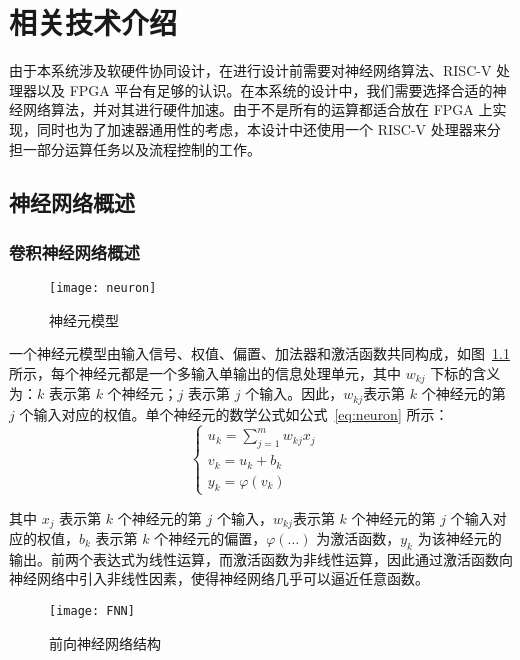 \chapter{相关技术介绍}\label{chap:relate}

由于本系统涉及软硬件协同设计，在进行设计前需要对神经网络算法、RISC-V 处理器以及 FPGA 平台有足够的认识。在本系统的设计中，我们需要选择合适的神经网络算法，并对其进行硬件加速。由于不是所有的运算都适合放在 FPGA 上实现，同时也为了加速器通用性的考虑，本设计中还使用一个 RISC-V 处理器来分担一部分运算任务以及流程控制的工作。

\section{神经网络概述}

\subsection{卷积神经网络概述}

\begin{figure}[!htbp]
    \centering
    \texttt{[image: neuron]}
    \caption{神经元模型}
    \label{fig:neuron}
\end{figure}

一个神经元模型由输入信号、权值、偏置、加法器和激活函数共同构成，如图~\ref{fig:neuron}所示，每个神经元都是一个多输入单输出的信息处理单元，其中 $w_{kj}$ 下标的含义为：$k$ 表示第 $k$ 个神经元；$j$ 表示第 $j$ 个输入。因此，$w_{kj}$表示第 $k$ 个神经元的第 $j$ 个输入对应的权值。单个神经元的数学公式如公式~\eqref{eq:neuron} 所示：
\begin{equation} \label{eq:neuron}
\begin{cases}
u_k = \sum_{j=1}^{m} w_{kj}x_j & \\
v_k = u_k + b_k & \\
y_k = \varphi(v_k) &
\end{cases}
\end{equation}

其中 $x_j$ 表示第 $k$ 个神经元的第 $j$ 个输入，$w_{kj}$表示第 $k$ 个神经元的第 $j$ 个输入对应的权值，$b_k$ 表示第 $k$ 个神经元的偏置，$\varphi(\dots)$ 为激活函数，$y_k$ 为该神经元的输出。前两个表达式为线性运算，而激活函数为非线性运算，因此通过激活函数向神经网络中引入非线性因素，使得神经网络几乎可以逼近任意函数。

\begin{figure}[!htbp]
    \centering
    \texttt{[image: FNN]}
    \caption{前向神经网络结构}
    \label{fig:FNN}
\end{figure}


